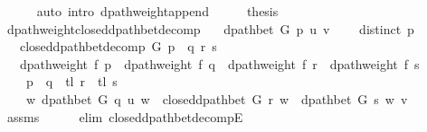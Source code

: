 \begin{isabellebody}
\ \ \ \ \isamarkupfalse%
\ {\isacharparenleft}{\kern0pt}auto\ intro{\isacharcolon}{\kern0pt}\ dpath{\isacharunderscore}{\kern0pt}weight{\isacharunderscore}{\kern0pt}append{\isacharunderscore}{\kern0pt}{}{\isacharparenright}{\kern0pt}\isanewline
\ \ \isamarkupfalse%
\ \isamarkupfalse%
\ {\isacharquery}{\kern0pt}thesis\isanewline
\ \ \ \ \isacommand{{\isachardot}{\kern0pt}}\isamarkupfalse%
\isanewline
{}\isamarkupfalse%
%
\endisatagproof
{\isafoldproof}%
%
\isadelimproof
\isanewline
%
\endisadelimproof
\isanewline
{}\isamarkupfalse%
\ dpath{\isacharunderscore}{\kern0pt}weight{\isacharunderscore}{\kern0pt}closed{\isacharunderscore}{\kern0pt}dpath{\isacharunderscore}{\kern0pt}bet{\isacharunderscore}{\kern0pt}decomp{\isacharcolon}{\kern0pt}\isanewline
\ \ \ {\isachardoublequoteopen}dpath{\isacharunderscore}{\kern0pt}bet\ G\ p\ u\ v{\isachardoublequoteclose}\isanewline
\ \ \ {\isachardoublequoteopen}{\isasymnot}\ distinct\ p{\isachardoublequoteclose}\isanewline
\ \ \ {\isachardoublequoteopen}closed{\isacharunderscore}{\kern0pt}dpath{\isacharunderscore}{\kern0pt}bet{\isacharunderscore}{\kern0pt}decomp\ G\ p\ {\isacharequal}{\kern0pt}\ {\isacharparenleft}{\kern0pt}q{\isacharcomma}{\kern0pt}\ r{\isacharcomma}{\kern0pt}\ s{\isacharparenright}{\kern0pt}{\isachardoublequoteclose}\isanewline
\ \ \ {\isachardoublequoteopen}dpath{\isacharunderscore}{\kern0pt}weight\ f\ p\ {\isacharequal}{\kern0pt}\ dpath{\isacharunderscore}{\kern0pt}weight\ f\ q\ {\isacharplus}{\kern0pt}\ dpath{\isacharunderscore}{\kern0pt}weight\ f\ r\ {\isacharplus}{\kern0pt}\ dpath{\isacharunderscore}{\kern0pt}weight\ f\ s{\isachardoublequoteclose}\isanewline
%
\isadelimproof
%
\endisadelimproof
%
\isatagproof
{}\isamarkupfalse%
\ {\isacharminus}{\kern0pt}\isanewline
\ \ \isamarkupfalse%
\isanewline
\ \ \ \ {\isachardoublequoteopen}p\ {\isacharequal}{\kern0pt}\ q\ {\isacharat}{\kern0pt}\ tl\ r\ {\isacharat}{\kern0pt}\ tl\ s{\isachardoublequoteclose}\isanewline
\ \ \ \ {\isachardoublequoteopen}{\isasymexists}w{\isachardot}{\kern0pt}\ dpath{\isacharunderscore}{\kern0pt}bet\ G\ q\ u\ w\ {\isasymand}\ closed{\isacharunderscore}{\kern0pt}dpath{\isacharunderscore}{\kern0pt}bet\ G\ r\ w\ {\isasymand}\ dpath{\isacharunderscore}{\kern0pt}bet\ G\ s\ w\ v{\isachardoublequoteclose}\isanewline
\ \ \ \ \isamarkupfalse%
\ assms\isanewline
\ \ \ \ \isamarkupfalse%
\ {\isacharparenleft}{\kern0pt}elim\ closed{\isacharunderscore}{\kern0pt}dpath{\isacharunderscore}{\kern0pt}bet{\isacharunderscore}{\kern0pt}decompE{\isacharunderscore}{\kern0pt}{}{\isacharparenright}{\kern0pt}\isanewline

\end{isabellebody}
